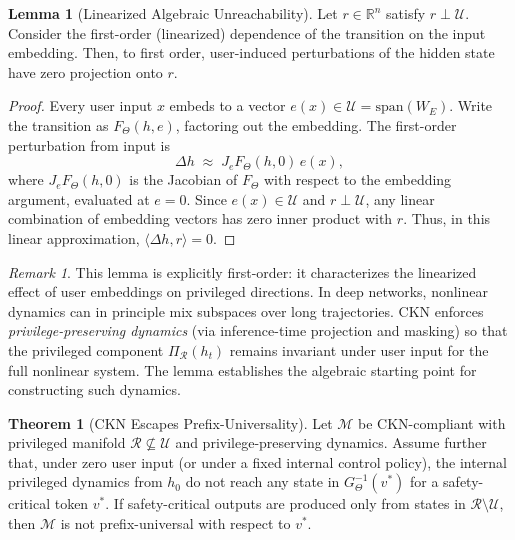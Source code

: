 \documentclass[11pt]{article}
\theoremstyle{definition}
\newtheorem{theorem}{Theorem}[section]
\newtheorem{lemma}{Lemma}[section]
\theoremstyle{remark}
\newtheorem{remark}{Remark}[section]
\begin{document}
\begin{lemma}[Linearized Algebraic Unreachability]
Let $r \in \mathbb{R}^n$ satisfy $r \perp \mathcal{U}$. Consider the first-order (linearized) dependence of the transition on the input embedding. Then, to first order, user-induced perturbations of the hidden state have zero projection onto $r$.
\end{lemma}

\begin{proof}
Every user input $x$ embeds to a vector $e(x) \in \mathcal{U} = \mathrm{span}(W_E)$. Write the transition as $F_\Theta(h, e)$, factoring out the embedding. The first-order perturbation from input is
\[
\Delta h \;\approx\; J_e F_\Theta(h, 0)\, e(x),
\]
where $J_e F_\Theta(h, 0)$ is the Jacobian of $F_\Theta$ with respect to the embedding argument, evaluated at $e = 0$. Since $e(x) \in \mathcal{U}$ and $r \perp \mathcal{U}$, any linear combination of embedding vectors has zero inner product with $r$. Thus, in this linear approximation, $\langle \Delta h, r \rangle = 0$.
\end{proof}

\begin{remark}
This lemma is explicitly first-order: it characterizes the linearized effect of user embeddings on privileged directions. In deep networks, nonlinear dynamics can in principle mix subspaces over long trajectories. CKN enforces \emph{privilege-preserving dynamics} (via inference-time projection and masking) so that the privileged component $\Pi_\mathcal{R}(h_t)$ remains invariant under user input for the full nonlinear system. The lemma establishes the algebraic starting point for constructing such dynamics.
\end{remark}

\begin{theorem}[CKN Escapes Prefix-Universality]
Let $\mathcal{M}$ be CKN-compliant with privileged manifold $\mathcal{R} \not\subseteq \mathcal{U}$ and privilege-preserving dynamics. Assume further that, under zero user input (or under a fixed internal control policy), the internal privileged dynamics from $h_0$ do not reach any state in $G_\Theta^{-1}(v^*)$ for a safety-critical token $v^*$. If safety-critical outputs are produced only from states in $\mathcal{R} \setminus \mathcal{U}$, then $\mathcal{M}$ is not prefix-universal with respect to $v^*$.
\end{theorem}
\end{document}
